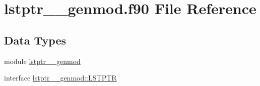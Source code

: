 \hypertarget{lstptr____genmod_8f90}{\section{lstptr\+\_\+\+\_\+genmod.\+f90 File Reference}
\label{lstptr____genmod_8f90}
}
\subsection*{Data Types}
\begin{DoxyCompactItemize}
\item 
module \hyperlink{classlstptr____genmod}{lstptr\+\_\+\+\_\+genmod}
\item 
interface \hyperlink{interfacelstptr____genmod_1_1LSTPTR}{lstptr\+\_\+\+\_\+genmod\+::\+L\+S\+T\+P\+T\+R}
\end{DoxyCompactItemize}
